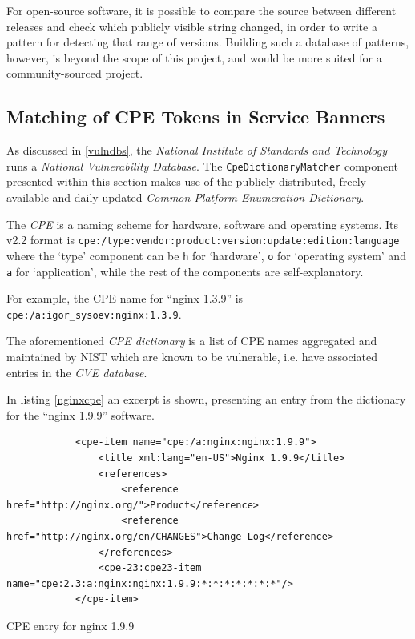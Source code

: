 \documentclass[a4paper,12pt]{article}
\begin{document}
	For open-source software, it is possible to compare the source between different releases and check which publicly visible string changed, in order to write a pattern for detecting that range of versions. Building such a database of patterns, however, is beyond the scope of this project, and would be more suited for a community-sourced project.
	
\subsection{Matching of CPE Tokens in Service Banners} \label{matchcpe}
 

	As discussed in \ref{vulndbs}, the \textit{National Institute of Standards and Technology} runs a \textit{National Vulnerability Database}. The \texttt{CpeDictionaryMatcher} component presented within this section makes use of the publicly distributed, freely available and daily updated \textit{Common Platform Enumeration Dictionary}.
	
	The \textit{CPE} is a naming scheme for hardware, software and operating systems\cite{cpe22}. Its v2.2 format is \texttt{cpe:/type:vendor:product:version:update:edition:language} where the `type' component can be \texttt{h} for `hardware', \texttt{o} for `operating system' and \texttt{a} for `application', while the rest of the components are self-explanatory.
	
	For example, the CPE name for ``nginx 1.3.9'' is \texttt{cpe:/a:igor_sysoev:nginx:1.3.9}.
	
	The aforementioned \textit{CPE dictionary} is a list of CPE names aggregated and maintained by NIST which are known to be vulnerable, i.e. have associated entries in the \textit{CVE database}.
	
	In listing \ref{nginxcpe} an excerpt is shown, presenting an entry from the dictionary for the ``nginx 1.9.9'' software.
	
	\begin{listing}[H]
		\begin{verbatim}
			<cpe-item name="cpe:/a:nginx:nginx:1.9.9">
				<title xml:lang="en-US">Nginx 1.9.9</title>
				<references>
					<reference href="http://nginx.org/">Product</reference>
					<reference href="http://nginx.org/en/CHANGES">Change Log</reference>
				</references>
				<cpe-23:cpe23-item name="cpe:2.3:a:nginx:nginx:1.9.9:*:*:*:*:*:*:*"/>
			</cpe-item>
		\end{verbatim}
		\caption{CPE entry for nginx 1.9.9}
		\label{nginxcpe}
	\end{listing}
	
\end{document}

